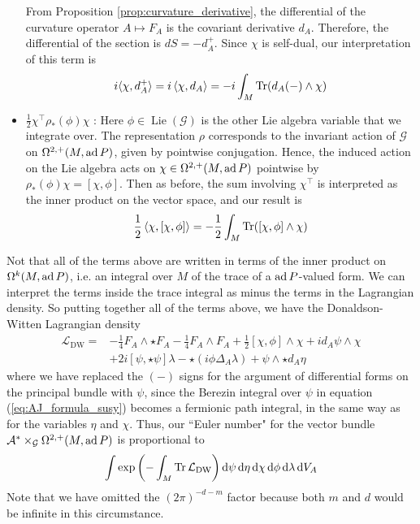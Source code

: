 \begin{itemize}[leftmargin=\parindent]
From Proposition \ref{prop:curvature_derivative}, the
differential of the curvature operator $A \mapsto F_A$ is the covariant
derivative  $d_A$. Therefore, the differential of the section is $dS = -d_A^+$.
Since $\chi$ is self-dual, our interpretation of this term is 
\[
	i\gen[*]{\chi,d_A^+} =i\gen{\chi,d_A}
	= -i\int_M \Tr(d_A(-)\wedge \chi)
\] 

	\item 
$\frac{1}{2}\chi^\intercal \rho_*(\phi)\chi$ :
Here $\phi \in \operatorname{Lie}(\mathcal{G})$ is the other Lie algebra 
variable that we integrate over. The representation $\rho$ corresponds to the
invariant action of $\mathcal{G}$ on $\Omega^{2,+}(M,\operatorname{ad} P)$, given by pointwise
conjugation. Hence, the induced action on the Lie algebra acts on $\chi\in
\Omega^{2,+}(M,\operatorname{ad} P)$ pointwise by $\rho_*(\phi) \chi = [\chi,\phi]$. 
Then as before, the sum involving  $\chi^\intercal$ is interpreted as the inner
product on the vector space, and our result is  
\[
\frac{1}{2} \gen{\chi,[\chi,\phi]} 
= -\frac{1}{2} \int_M \Tr([\chi,\phi]\wedge \chi)
\] 
\end{itemize}

Not that all of the terms above are written in terms of the inner product on
$\Omega^k(M,\operatorname{ad} P)$, i.e. an integral over $M$ of the trace of a $\operatorname{ad} P$-valued
form. We can interpret the terms inside the trace integral as minus the terms 
in the Lagrangian
density. So putting together all of the terms above, we have the
Donaldson-Witten Lagrangian density
\begin{align}
	\mathcal{L}_{\text{DW}}
	= &-\frac{1}{4}F_A\wedge\star F_A - \frac{1}{4}F_A\wedge F_A
	+\frac{1}{2} [\chi,\phi]\wedge \chi + id_A\psi\wedge \chi \nonumber \\
	& +2i[\psi,\star\psi]\lambda - \star(i\phi \Delta_A\lambda) + 
	\psi\wedge \star d_A\eta \label{eq:dw_lagrangian}
\end{align}
where we have replaced the $(-)$ signs for the argument of differential forms on
the principal bundle with  $\psi$, since the Berezin integral over $\psi$ in 
equation (\ref{eq:AJ_formula_susy}) becomes a fermionic path integral, in the
same way as for the variables $\eta$ and $\chi$. 
Thus, our ``Euler number" for the vector bundle $\mathcal{A}^*
\times_\mathcal{G}\Omega^{2,+}(M,\operatorname{ad} P)$ is proportional to
\begin{equation} \label{eq:dw_euler_number}
	\int \exp \paren{-\int_M \Tr \mathcal{L}_{\text{DW}} }
	\odif{\psi}\odif{\eta} \odif{\chi} \odif{\phi}\odif{\lambda}\odif{V_A} 
\end{equation}
Note that we have omitted the $(2\pi)^{-d-m}$ factor because both $m$ and  $d$
would be infinite in this circumstance. 


